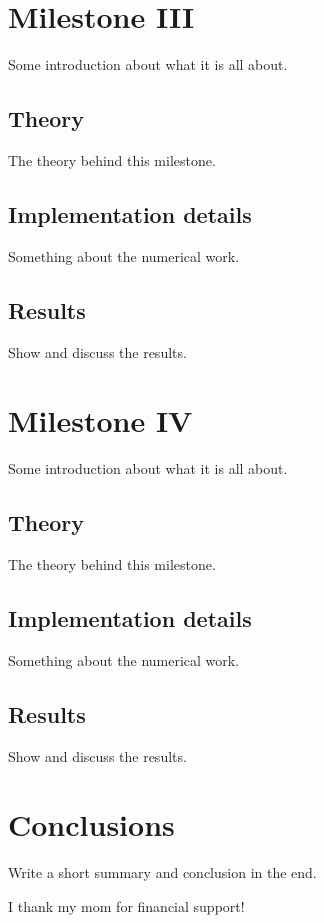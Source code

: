 \section{Milestone III}
Some introduction about what it is all about.

\subsection{Theory}
The theory behind this milestone.

\subsection{Implementation details}
Something about the numerical work.

\subsection{Results}
Show and discuss the results.

\section{Milestone IV}
Some introduction about what it is all about.

\subsection{Theory}
The theory behind this milestone.

\subsection{Implementation details}
Something about the numerical work.

\subsection{Results}
Show and discuss the results.

\section{Conclusions}

Write a short summary and conclusion in the end. 

\begin{acknowledgements}
      I thank my mom for financial support!
\end{acknowledgements}



